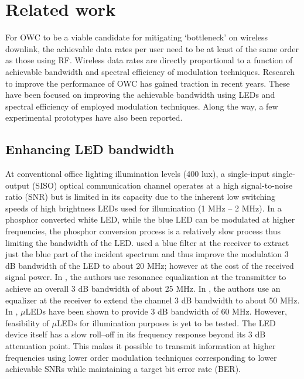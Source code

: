 \section{Related work}
\label{sec:related}
\graphicspath{{_Intro/Figures/}}

For OWC to be a viable candidate for mitigating `bottleneck' on wireless downlink, the achievable data rates per user need to be at least of the same order as those using RF. Wireless data rates are directly proportional to a function of achievable bandwidth and spectral efficiency of modulation techniques. Research to improve the performance of OWC has gained traction in recent years. These have been focused on improving the achievable bandwidth using LEDs and spectral efficiency of employed modulation techniques. Along the way, a few experimental prototypes have also been reported. 

\subsection{Enhancing LED bandwidth}
\label{relatedBandwidth}
At conventional office lighting illumination levels (400 lux), a single-input single-output (SISO) optical communication channel operates at a high signal-to-noise ratio (SNR) but is limited in its capacity due to the inherent low switching speeds of high brightness LEDs used for illumination (1 MHz -- 2 MHz). In a phosphor converted white LED, while the blue LED can be modulated at higher frequencies, the phosphor conversion process is a relatively slow process thus limiting the bandwidth of the LED. \cite{gru08b} used a blue filter at the receiver to extract just the blue part of the incident spectrum and thus improve the modulation 3 dB bandwidth of the LED to about 20 MHz; however at the cost of the received signal power.  In \cite{min08a}, the authors use resonance equalization at the transmitter to achieve an overall 3 dB bandwidth of about 25 MHz. In \cite{zen08a}, the authors use an equalizer at the receiver to extend the channel 3 dB bandwidth to about 50 MHz. In \cite{tso14a}, $\mu$LEDs have been shown to provide 3 dB bandwidth of 60 MHz. However, feasibility of $\mu$LEDs for illumination purposes is yet to be tested. The LED device itself has a slow roll--off in its frequency response beyond its 3 dB attenuation point. This makes it possible to transmit information at higher frequencies using lower order modulation techniques corresponding to lower achievable SNRs while maintaining a target bit error rate (BER).

